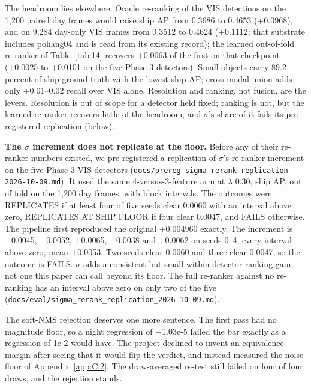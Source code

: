 \documentclass[journal,onecolumn]{IEEEtran}
\begin{document}
The headroom lies elsewhere. Oracle re-ranking of the VIS detections on the 1,200 paired day frames would raise ship AP from 0.3686 to 0.4653 (+0.0968), and on 9,284 day-only VIS frames from 0.3512 to 0.4624 (+0.1112; that substrate includes pohang04 and is read from its existing record); the learned out-of-fold re-ranker of Table~\ref{tab:14} recovers +0.0063 of the first on that checkpoint (+0.0025 to +0.0101 on the five Phase 3 detectors). Small objects carry 89.2 percent of ship ground truth with the lowest ship AP; cross-modal union adds only +0.01--0.02 recall over VIS alone. Resolution and ranking, not fusion, are the levers. Resolution is out of scope for a detector held fixed; ranking is not, but the learned re-ranker recovers little of the headroom, and $\sigma$'s share of it fails its pre-registered replication (below).

\textbf{The $\sigma$ increment does not replicate at the floor.} Before any of their re-ranker numbers existed, we pre-registered a replication of $\sigma$'s re-ranker increment on the five Phase 3 VIS detectors (\texttt{docs/\allowbreak{}prereg-\allowbreak{}sigma-\allowbreak{}rerank-\allowbreak{}replication-\allowbreak{}2026-\allowbreak{}10-\allowbreak{}09.md}). It used the same 4-versus-3-feature arm at $\lambda$ 0.30, ship AP, out of fold on the 1,200 day frames, with block intervals. The outcomes were REPLICATES if at least four of five seeds clear 0.0060 with an interval above zero, REPLICATES AT SHIP FLOOR if four clear 0.0047, and FAILS otherwise. The pipeline first reproduced the original +0.004960 exactly. The increment is +0.0045, +0.0052, +0.0065, +0.0038 and +0.0062 on seeds 0--4, every interval above zero, mean +0.0053. Two seeds clear 0.0060 and three clear 0.0047, so the outcome is FAILS. $\sigma$ adds a consistent but small within-detector ranking gain, not one this paper can call beyond its floor. The full re-ranker against no re-ranking has an interval above zero on only two of the five (\texttt{docs/\allowbreak{}eval/\allowbreak{}sigma\_\allowbreak{}rerank\_\allowbreak{}replication\_\allowbreak{}2026-\allowbreak{}10-\allowbreak{}09.md}).

The soft-NMS rejection deserves one more sentence. The first pass had no magnitude floor, so a night regression of $-$1.03e-5 failed the bar exactly as a regression of 1e-2 would have. The project declined to invent an equivalence margin after seeing that it would flip the verdict, and instead measured the noise floor of Appendix~\ref{app:C.2}. The draw-averaged re-test still failed on four of four draws, and the rejection stands.
\end{document}

